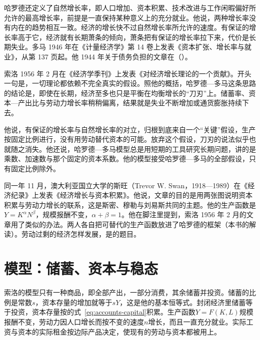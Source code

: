 哈罗德还定义了自然增长率，即人口增加、资本积累、技术改进与工作闲暇偏好所允许的最高增长率，前提是一直保持某种意义上的充分就业\cite{harrod1939}。他说，两种增长率没有内在的趋势相互一致\cite{harrod1939}。经济的增长快不过自然增长率所允许的速度\cite{harrod1939}。有保证的增长率高于它，经济就有长期萧条的倾向，萧条把有保证的增长率拉下来，代价是长期失业\cite{harrod1939}。多马 1946 年在《计量经济学》第 14 卷上发表《资本扩张、增长率与就业》，从第 137 页起\cite{domar1946}。他 1944 年关于债务负担的文章在（）。

索洛 1956 年 2 月在《经济学季刊》上发表《对经济增长理论的一个贡献》\cite{solow1956}。开头一句是，一切理论都依赖不完全真实的假设\cite{solow1956}。照他的概括，哈罗德—多马这条思路的结论是，即使在长期，经济至多也只是平衡在均衡增长的“刀刃”上\cite{solow1956}。储蓄率、资本—产出比与劳动力增长率稍稍偏离，结果就是失业不断增加或通货膨胀持续下去\cite{solow1956}。

他说，有保证的增长率与自然增长率的对立，归根到底来自一个“关键”假设，生产按固定比例进行，没有用劳动替代资本的可能\cite{solow1956}。放弃这个假设，刀刃的说法似乎也就随之消失\cite{solow1956}。他还说，哈罗德—多马模型总是用短期的工具研究长期问题，讲的是乘数、加速数与那个固定的资本系数\cite{solow1956}。他的模型接受哈罗德—多马的全部假设，只有固定比例除外\cite{solow1956}。

同一年 11 月，澳大利亚国立大学的斯旺（Trevor W. Swan，1918—1989）在《经济纪录》上发表《经济增长与资本积累》\cite{swan1956,loc40,gnd40}。他说，文章的目的是用两张图说明资本积累与劳动力增长的联系，这是斯密、穆勒与刘易斯共同的主题\cite{swan1956}。他的生产函数是$Y=K^{\alpha}N^{\beta}$，规模报酬不变，$\alpha+\beta=1$\cite{swan1956}。他在脚注里提到，索洛 1956 年 2 月的文章用了类似的办法\cite{swan1956}。两人各自把可替代的生产函数放进了哈罗德的框架（本书的解读）。劳动过剩的经济怎样发展，是的题目。

\section{模型：储蓄、资本与稳态}\label{sec:solow-model}

索洛的模型只有一种商品，即全部产出，一部分消费，其余储蓄并投资\cite{solow1956}。储蓄的比例是常数$s$，资本存量的增加就等于$sY$，这是他的基本恒等式\cite{solow1956}。封闭经济里储蓄等于投资，资本存量按的式~\eqref{eq:accounts-capital}积累。生产函数$Y=F(K,L)$规模报酬不变，劳动力因人口增长而按不变的速度$n$增长，而且一直充分就业\cite{solow1956}。实际工资与资本的实际租金按边际产品决定，使现有的劳动与资本都被用上\cite{solow1956}。

